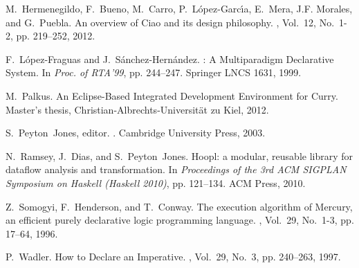 \documentclass{llncs}
\begin{document}
\begin{thebibliography}{10}
M.~Hermenegildo, F.~Bueno, M.~Carro, P.~L{\'o}pez-Garc{\'\i}a, E.~Mera, J.F.
  Morales, and G.~Puebla.
\newblock An overview of {Ciao} and its design philosophy.
, Vol.~12, No.~1-2, pp.
  219--252, 2012.

F.~L\'opez-Fraguas and J.~S\'anchez-Hern\'andez.
: A Multiparadigm Declarative System.
\newblock In {\em Proc. of RTA'99}, pp. 244--247. Springer LNCS 1631, 1999.

M.~Palkus.
\newblock An Eclipse-Based Integrated Development Environment for Curry.
\newblock Master's thesis, Christian-Albrechts-Universit{\"a}t zu Kiel, 2012.

S.~Peyton~Jones, editor.
.
\newblock Cambridge University Press, 2003.

N.~Ramsey, J.~Dias, and S.~Peyton~Jones.
\newblock Hoopl: a modular, reusable library for dataflow analysis and
  transformation.
\newblock In {\em Proceedings of the 3rd ACM SIGPLAN Symposium on Haskell
  (Haskell 2010)}, pp. 121--134. ACM Press, 2010.

Z.~Somogyi, F.~Henderson, and T.~Conway.
\newblock The execution algorithm of {Mercury}, an efficient purely declarative
  logic programming language.
, Vol.~29, No.~1-3, pp. 17--64,
  1996.

P.~Wadler.
\newblock How to Declare an Imperative.
, Vol.~29, No.~3, pp. 240--263, 1997.

\end{thebibliography}
\end{document}
